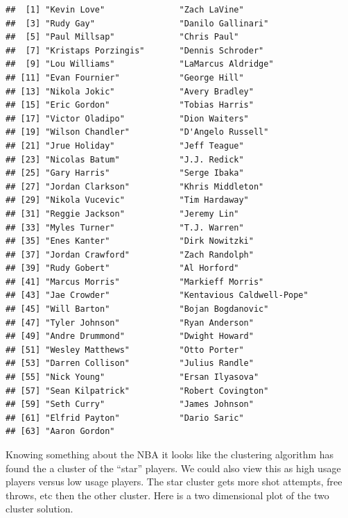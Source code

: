\documentclass[
]{book}
\newenvironment{Shaded}{\begin{snugshade}}{\end{snugshade}}
\newcommand{\DecValTok}[1]{\textcolor[rgb]{0.00,0.00,0.81}{#1}}
\newcommand{\FunctionTok}[1]{\textcolor[rgb]{0.00,0.00,0.00}{#1}}
\newcommand{\NormalTok}[1]{#1}
\newcommand{\SpecialCharTok}[1]{\textcolor[rgb]{0.00,0.00,0.00}{#1}}
\theoremstyle{definition}
\theoremstyle{definition}
\theoremstyle{definition}
\theoremstyle{definition}
\theoremstyle{remark}
\begin{document}
\begin{Shaded}
\end{Shaded}

\begin{verbatim}
##  [1] "Kevin Love"               "Zach LaVine"             
##  [3] "Rudy Gay"                 "Danilo Gallinari"        
##  [5] "Paul Millsap"             "Chris Paul"              
##  [7] "Kristaps Porzingis"       "Dennis Schroder"         
##  [9] "Lou Williams"             "LaMarcus Aldridge"       
## [11] "Evan Fournier"            "George Hill"             
## [13] "Nikola Jokic"             "Avery Bradley"           
## [15] "Eric Gordon"              "Tobias Harris"           
## [17] "Victor Oladipo"           "Dion Waiters"            
## [19] "Wilson Chandler"          "D'Angelo Russell"        
## [21] "Jrue Holiday"             "Jeff Teague"             
## [23] "Nicolas Batum"            "J.J. Redick"             
## [25] "Gary Harris"              "Serge Ibaka"             
## [27] "Jordan Clarkson"          "Khris Middleton"         
## [29] "Nikola Vucevic"           "Tim Hardaway"            
## [31] "Reggie Jackson"           "Jeremy Lin"              
## [33] "Myles Turner"             "T.J. Warren"             
## [35] "Enes Kanter"              "Dirk Nowitzki"           
## [37] "Jordan Crawford"          "Zach Randolph"           
## [39] "Rudy Gobert"              "Al Horford"              
## [41] "Marcus Morris"            "Markieff Morris"         
## [43] "Jae Crowder"              "Kentavious Caldwell-Pope"
## [45] "Will Barton"              "Bojan Bogdanovic"        
## [47] "Tyler Johnson"            "Ryan Anderson"           
## [49] "Andre Drummond"           "Dwight Howard"           
## [51] "Wesley Matthews"          "Otto Porter"             
## [53] "Darren Collison"          "Julius Randle"           
## [55] "Nick Young"               "Ersan Ilyasova"          
## [57] "Sean Kilpatrick"          "Robert Covington"        
## [59] "Seth Curry"               "James Johnson"           
## [61] "Elfrid Payton"            "Dario Saric"             
## [63] "Aaron Gordon"
\end{verbatim}

Knowing something about the NBA it looks like the clustering algorithm has found the a cluster of the ``star'' players. We could also view this as high usage players versus low usage players. The star cluster gets more shot attempts, free throws, etc then the other cluster. Here is a two dimensional plot of the two cluster solution.
\end{document}

